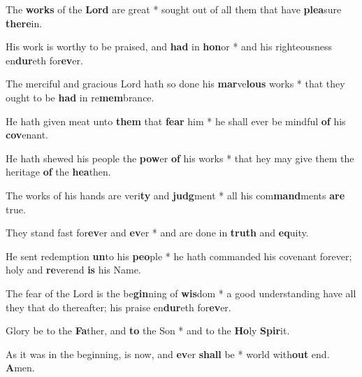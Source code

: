 \begin{multicols}{2}
	The \textbf{works} of the \textbf{Lord} are great * sought out of all them that have \textbf{plea}sure \textbf{there}in.
	
	His work is worthy to be praised, and \textbf{had} in \textbf{hon}or * and his righteousness en\textbf{dur}eth for\textbf{ev}er.
	
	The merciful and gracious Lord hath so done his \textbf{mar}ve\textbf{lous} works * that they ought to be \textbf{had} in re\textbf{mem}brance.
	
	He hath given meat unto \textbf{them} that \textbf{fear} him * he shall ever be mindful \textbf{of} his \textbf{cov}enant.
	
	He hath shewed his people the \textbf{pow}er \textbf{of} his works * that hey may give them the heritage \textbf{of} the \textbf{hea}then.
	
	The works of his hands are veri\textbf{ty} and \textbf{judg}ment * all his com\textbf{mand}ments \textbf{are} true.
	
	They stand fast for\textbf{ev}er and \textbf{ev}er * and are done in \textbf{truth} and \textbf{eq}uity.
	
	He sent redemption \textbf{un}to his \textbf{peo}ple * he hath commanded his covenant forever; holy and \textbf{re}verend \textbf{is} his Name.
	
	The fear of the Lord is the be\textbf{gin}ning of \textbf{wis}dom * a good understanding have all they that do thereafter; his praise en\textbf{dur}eth for\textbf{ev}er.
	
	Glory be to the \textbf{Fa}ther, and \textbf{to} the Son * and to the \textbf{Ho}ly \textbf{Spir}it.
	
	As it was in the beginning, is now, and \textbf{ev}er \textbf{shall} be * world with\textbf{out} end. \textbf{A}men.
\end{multicols}